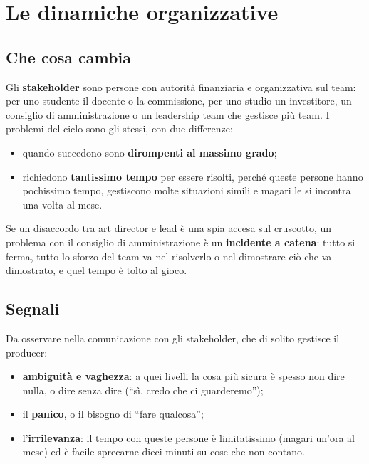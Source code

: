 \section{Le dinamiche organizzative}
\label{sec:c3-3-organizzazione}

\subsection{Che cosa cambia}

Gli \textbf{stakeholder} sono persone con autorità finanziaria e organizzativa sul
team: per uno studente il docente o la commissione, per uno studio un investitore,
un consiglio di amministrazione o un leadership team che gestisce più team. I
problemi del ciclo sono gli stessi, con due differenze:
\begin{itemize}
  \item quando succedono sono \textbf{dirompenti al massimo grado};
  \item richiedono \textbf{tantissimo tempo} per essere risolti, perché queste
        persone hanno pochissimo tempo, gestiscono molte situazioni simili e magari
        le si incontra una volta al mese.
\end{itemize}
Se un disaccordo tra art director e lead è una spia accesa sul cruscotto, un
problema con il consiglio di amministrazione è un \textbf{incidente a catena}:
tutto si ferma, tutto lo sforzo del team va nel risolverlo o nel dimostrare ciò che
va dimostrato, e quel tempo è tolto al gioco.

\subsection{Segnali}

Da osservare nella comunicazione con gli stakeholder, che di solito gestisce il
producer:
\begin{itemize}
  \item \textbf{ambiguità e vaghezza}: a quei livelli la cosa più sicura è spesso
        non dire nulla, o dire senza dire (``sì, credo che ci guarderemo'');
  \item il \textbf{panico}, o il bisogno di ``fare qualcosa'';
  \item l'\textbf{irrilevanza}: il tempo con queste persone è limitatissimo (magari
        un'ora al mese) ed è facile sprecarne dieci minuti su cose che non
        contano.
\end{itemize}

